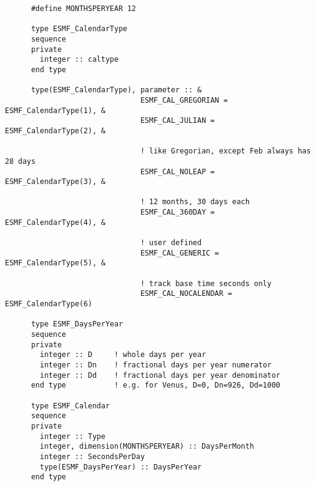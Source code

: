 \begin{verbatim}
      #define MONTHSPERYEAR 12

      type ESMF_CalendarType
      sequence
      private
        integer :: caltype
      end type

      type(ESMF_CalendarType), parameter :: &
                               ESMF_CAL_GREGORIAN =  ESMF_CalendarType(1), &
                               ESMF_CAL_JULIAN =     ESMF_CalendarType(2), &

                               ! like Gregorian, except Feb always has 28 days
                               ESMF_CAL_NOLEAP =     ESMF_CalendarType(3), &

                               ! 12 months, 30 days each
                               ESMF_CAL_360DAY =     ESMF_CalendarType(4), &

                               ! user defined
                               ESMF_CAL_GENERIC =    ESMF_CalendarType(5), &

                               ! track base time seconds only
                               ESMF_CAL_NOCALENDAR = ESMF_CalendarType(6)

      type ESMF_DaysPerYear
      sequence
      private
        integer :: D     ! whole days per year
        integer :: Dn    ! fractional days per year numerator
        integer :: Dd    ! fractional days per year denominator
      end type           ! e.g. for Venus, D=0, Dn=926, Dd=1000

      type ESMF_Calendar
      sequence
      private
        integer :: Type
        integer, dimension(MONTHSPERYEAR) :: DaysPerMonth
        integer :: SecondsPerDay
        type(ESMF_DaysPerYear) :: DaysPerYear
      end type
\end{verbatim}

